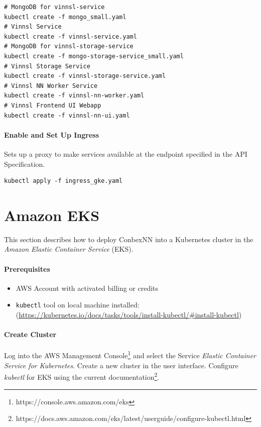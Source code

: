 \begin{verbatim}
# MongoDB for vinnsl-service
kubectl create -f mongo_small.yaml 
# Vinnsl Service
kubectl create -f vinnsl-service.yaml
# MongoDB for vinnsl-storage-service
kubectl create -f mongo-storage-service_small.yaml
# Vinnsl Storage Service
kubectl create -f vinnsl-storage-service.yaml
# Vinnsl NN Worker Service
kubectl create -f vinnsl-nn-worker.yaml
# Vinnsl Frontend UI Webapp
kubectl create -f vinnsl-nn-ui.yaml
\end{verbatim}

\paragraph{Enable and Set Up Ingress}\label{enable-and-set-up-ingress-1}

Sets up a proxy to make services available at the endpoint specified in
the API Specification.

\begin{verbatim}
kubectl apply -f ingress_gke.yaml
\end{verbatim}

\section{Amazon EKS}\label{amazon-eks}

This section describes how to deploy ConbexNN into a Kubernetes cluster
in the \emph{Amazon Elastic Container Service} (EKS).

\paragraph{Prerequisites}\label{prerequisites-2}

\begin{itemize}
\tightlist
\item
  AWS Account with activated billing or credits
\item
  \texttt{kubectl} tool on local machine installed:
  (\url{https://kubernetes.io/docs/tasks/tools/install-kubectl/\#install-kubectl})
\end{itemize}

\paragraph{Create Cluster}\label{create-cluster-1}

Log into the AWS Management Console\footnote{https://console.aws.amazon.com/eks}
and select the Service \emph{Elastic Container Service for Kubernetes}.
Create a new cluster in the user interface. Configure \emph{kubectl} for
EKS using the current documentation\footnote{https://docs.aws.amazon.com/eks/latest/userguide/configure-kubectl.html}.

